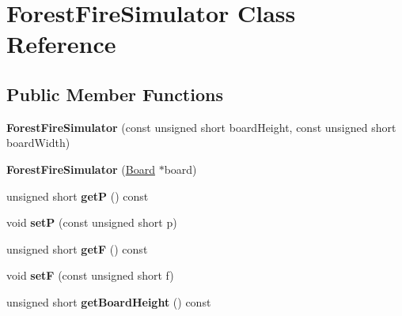\hypertarget{class_forest_fire_simulator}{}\section{Forest\+Fire\+Simulator Class Reference}
\label{class_forest_fire_simulator}
\subsection*{Public Member Functions}
\begin{DoxyCompactItemize}
\item 
{\bfseries Forest\+Fire\+Simulator} (const unsigned short board\+Height, const unsigned short board\+Width)\hypertarget{class_forest_fire_simulator_acc1e5b4eb1e9992595fa792f33d64528}{}\label{class_forest_fire_simulator_acc1e5b4eb1e9992595fa792f33d64528}

\item 
{\bfseries Forest\+Fire\+Simulator} (\hyperlink{class_board}{Board} $\ast$board)\hypertarget{class_forest_fire_simulator_ac90c8968a508a33c4297c560c7bba152}{}\label{class_forest_fire_simulator_ac90c8968a508a33c4297c560c7bba152}

\item 
unsigned short {\bfseries getP} () const \hypertarget{class_forest_fire_simulator_aca8b6dcbc0ee2b4925b31774b1bd418b}{}\label{class_forest_fire_simulator_aca8b6dcbc0ee2b4925b31774b1bd418b}

\item 
void {\bfseries setP} (const unsigned short p)\hypertarget{class_forest_fire_simulator_af33484c4143441d5d06ef4f66f88a0d4}{}\label{class_forest_fire_simulator_af33484c4143441d5d06ef4f66f88a0d4}

\item 
unsigned short {\bfseries getF} () const \hypertarget{class_forest_fire_simulator_a10f512f389ccd1f72e7f467845c32ac4}{}\label{class_forest_fire_simulator_a10f512f389ccd1f72e7f467845c32ac4}

\item 
void {\bfseries setF} (const unsigned short f)\hypertarget{class_forest_fire_simulator_a08b490ca8cda7cf39096a42a33ad1ecc}{}\label{class_forest_fire_simulator_a08b490ca8cda7cf39096a42a33ad1ecc}

\item 
unsigned short {\bfseries get\+Board\+Height} () const \hypertarget{class_forest_fire_simulator_a4b37c0227d160eca340db39764727ef5}{}\label{class_forest_fire_simulator_a4b37c0227d160eca340db39764727ef5}


\end{DoxyCompactItemize}
